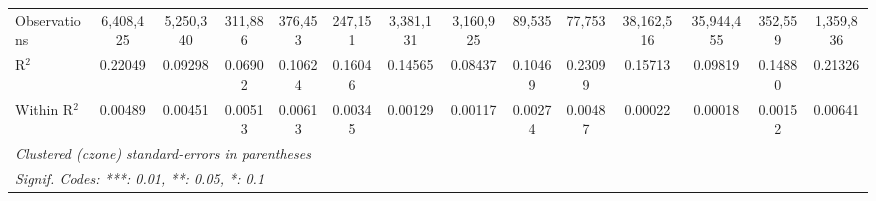 \begin{tabular}{lccccccccccccc}
Observations & 6,408,425&5,250,340&311,886&376,453&247,151&3,381,131&3,160,925&89,535&77,753&38,162,516&35,944,455&352,559&1,359,836\\
R$^2$ & 0.22049&0.09298&0.06902&0.10624&0.16046&0.14565&0.08437&0.10469&0.23099&0.15713&0.09819&0.14880&0.21326\\
Within R$^2$ & 0.00489&0.00451&0.00513&0.00613&0.00345&0.00129&0.00117&0.00274&0.00487&0.00022&0.00018&0.00152&0.00641\\
\midrule\midrule\multicolumn{14}{l}{\emph{Clustered (czone) standard-errors in parentheses}}\\
\multicolumn{14}{l}{\emph{Signif. Codes: ***: 0.01, **: 0.05, *: 0.1}}\\
\end{tabular}


